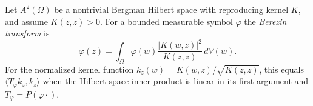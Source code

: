 
Let $A^2(\Omega)$ be a nontrivial Bergman Hilbert space with reproducing kernel $K$, and assume $K(z,z)>0$. For a bounded measurable symbol $\varphi$ the \emph{Berezin transform} is
\[
\widetilde{\varphi}(z)=\int_\Omega\varphi(w)\frac{|K(w,z)|^2}{K(z,z)}\,dV(w).
\]
For the normalized kernel function $k_z(w)=K(w,z)/\sqrt{K(z,z)}$, this equals $\langle T_\varphi k_z,k_z\rangle$ when the Hilbert-space inner product is linear in its first argument and $T_\varphi=P(\varphi\cdot)$.
